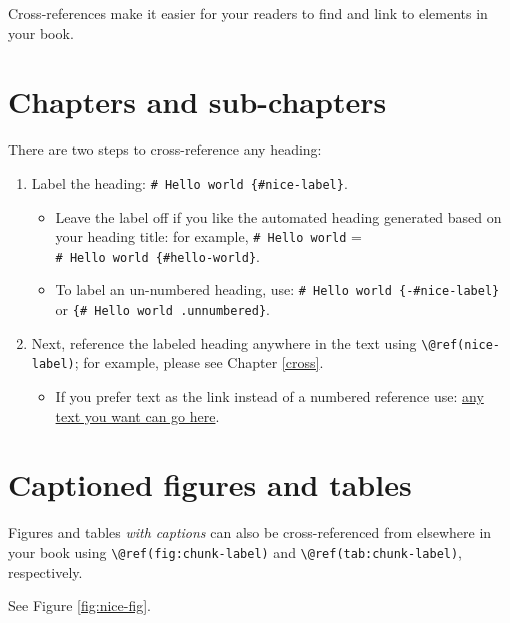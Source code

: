 \documentclass[12pt, oneside, openright]{byuthesis}
\providecommand{\tightlist}{%
  \setlength{\itemsep}{0pt}\setlength{\parskip}{0pt}}
\begin{document}
Cross-references make it easier for your readers to find and link to elements in your book.

\hypertarget{chapters-and-sub-chapters}{%
\section{Chapters and sub-chapters}\label{chapters-and-sub-chapters}}

There are two steps to cross-reference any heading:

\begin{enumerate}
\def\labelenumi{\arabic{enumi}.}
\tightlist
\item
  Label the heading: \texttt{\#\ Hello\ world\ \{\#nice-label\}}.

  \begin{itemize}
  \tightlist
  \item
    Leave the label off if you like the automated heading generated based on your heading title: for example, \texttt{\#\ Hello\ world} = \texttt{\#\ Hello\ world\ \{\#hello-world\}}.
  \item
    To label an un-numbered heading, use: \texttt{\#\ Hello\ world\ \{-\#nice-label\}} or \texttt{\{\#\ Hello\ world\ .unnumbered\}}.
  \end{itemize}
\item
  Next, reference the labeled heading anywhere in the text using \texttt{\textbackslash{}@ref(nice-label)}; for example, please see Chapter \ref{cross}.

  \begin{itemize}
  \tightlist
  \item
    If you prefer text as the link instead of a numbered reference use: \protect\hyperlink{cross}{any text you want can go here}.
  \end{itemize}
\end{enumerate}

\hypertarget{captioned-figures-and-tables}{%
\section{Captioned figures and tables}\label{captioned-figures-and-tables}}

Figures and tables \emph{with captions} can also be cross-referenced from elsewhere in your book using \texttt{\textbackslash{}@ref(fig:chunk-label)} and \texttt{\textbackslash{}@ref(tab:chunk-label)}, respectively.

See Figure \ref{fig:nice-fig}.
\end{document}
